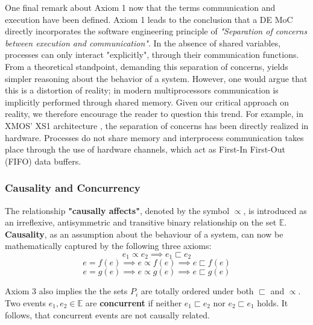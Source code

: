 \documentclass[11pt]{article}
\begin{document}
One final remark about Axiom 1 now that the terms communication and execution have been defined.
Axiom 1 leads to the conclusion that a DE MoC directly incorporates the software engineering principle of \textit{"Separation of concerns between execution and communication"}.
In the absence of shared variables, processes can only interact "explicitly", through their communication functions.
From a theoretical standpoint, demanding this separation of concerns, yields simpler reasoning about the behavior of a system.
However, one would argue that this is a distortion of reality; in modern multiprocessors communication is implicitly performed through shared memory.
Given our critical approach on reality, we therefore encourage the reader to question this trend.
For example, in XMOS' XS1 architecture \cite{May2009}, the separation of concerns has been directly realized in hardware.
Processes do not share memory and interprocess communication takes place through the use of hardware channels, which act as First-In First-Out (FIFO) data buffers.

\subsubsection{Causality and Concurrency}
\label{sec:org3dada3c}
The relationship \textbf{"causally affects"}, denoted by the symbol \(\propto\), is introduced as an irreflexive, antisymmetric and transitive binary relationship on the set \(\mathds{E}\).
\textbf{Causality}, as an assumption about the behaviour of a system, can now be mathematically captured by the following three axioms:
\begin{equation}
\tag{Axiom 2}
e_1 \propto e_2 \implies e_1 \sqsubset e_2
\end{equation}
\begin{equation}
\tag{Axiom 3}
e = f(e) \implies e \propto f(e) \implies e \sqsubset f(e) 
\end{equation}
\begin{equation}
\tag{Axiom 4}
e = g(e) \implies e \propto g(e) \implies e \sqsubset g(e)
\end{equation}

Axiom 3 also implies the the sets \(P_i\) are totally ordered under both \(\sqsubset\) and \(\propto\).
Two events \(e_1,e_2 \in \mathds{E}\) are \textbf{concurrent} if neither \(e_1 \sqsubset e_2\) nor \(e_2 \sqsubset e_1\) holds.
It follows, that concurrent events are not causally related.
\end{document}
